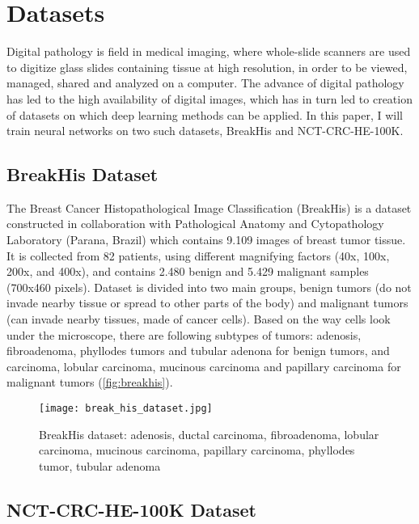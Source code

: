\section{Datasets}
Digital pathology is field in medical imaging, where whole-slide scanners are used to digitize glass slides containing tissue at high resolution, in order to be viewed, managed, shared and analyzed on a computer. The advance of digital pathology has led to the high availability of digital images, which has in turn led to creation of datasets on which deep learning methods can be applied. In this paper, I will train neural networks on two such datasets, BreakHis and NCT-CRC-HE-100K.

\subsection{BreakHis Dataset}

The Breast Cancer Histopathological Image Classification (BreakHis) is a dataset constructed in collaboration with Pathological Anatomy and Cytopathology Laboratory (Parana, Brazil) which contains 9.109 images of breast tumor tissue. It is collected from 82 patients, using different magnifying factors (40x, 100x, 200x, and 400x), and contains 2.480  benign and 5.429 malignant samples (700x460 pixels). Dataset is divided into two main groups, benign tumors (do not invade nearby tissue or spread to other parts of the body) and malignant tumors (can invade nearby tissues, made of cancer cells). Based on the way cells look under the microscope, there are following subtypes of tumors: adenosis, fibroadenoma, phyllodes tumors and tubular adenona for benign tumors, and carcinoma, lobular carcinoma, mucinous carcinoma and papillary carcinoma for malignant tumors (\textcolor{red}{\autoref{fig:breakhis}}).

\captionsetup[figure]{font=scriptsize,labelfont=scriptsize}

\begin{figure}[h]
	\centering
	\texttt{[image: break\_his\_dataset.jpg]}
	\caption{BreakHis dataset: adenosis, ductal carcinoma, fibroadenoma, lobular carcinoma, mucinous carcinoma, papillary carcinoma, phyllodes tumor, tubular adenoma}
	\label{fig:breakhis}
\end{figure}

\subsection{NCT-CRC-HE-100K Dataset}

